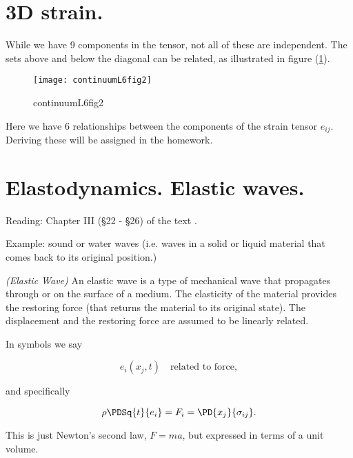 \section{3D strain.}

While we have 9 components in the tensor, not all of these are independent.  The sets above and below the diagonal can be related, as illustrated in figure (\ref{fig:continuumL6:continuumL6fig2}).

\begin{figure}[htp]
   \centering
   \texttt{[image: continuumL6fig2]}
   \caption{continuumL6fig2}\label{fig:continuumL6:continuumL6fig2}
\end{figure}

Here we have 6 relationships between the components of the strain tensor $e_{ij}$.  Deriving these will be assigned in the homework.

\section{Elastodynamics.  Elastic waves.}

Reading: Chapter III (\S 22 - \S 26) of the text \cite{landau1960theory}.

Example: sound or water waves (i.e. waves in a solid or liquid material that comes back to its original position.)

\begin{definition}
\emph{(Elastic Wave)}
\label{dfn:continuumL6:10}
An elastic wave is a type of mechanical wave that propagates through or on the surface of a medium.  The elasticity of the material provides the restoring force (that returns the material to its original state).  The displacement and the restoring force are assumed to be linearly related.
\end{definition}

In symbols we say

\begin{equation}\label{eqn:continuumL6:130}
e_i(x_j, t) \quad \mbox{related to force},
\end{equation}

and specifically

\begin{equation}\label{eqn:continuumL6:150}
\rho \PDSq{t}{e_i} = F_i = \PD{x_j}{\sigma_{ij}}.
\end{equation}

This is just Newton's second law, $F = ma$, but expressed in terms of a unit volume.

